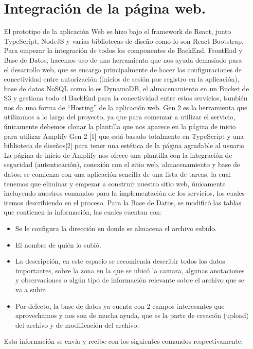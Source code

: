 \section{Integración de la página web.}

El prototipo de la aplicación Web se hizo bajo el framework de React, junto TypeScript, NodeJS y varías bibliotecas de diseño como lo son React Bootstrap, 
Para empezar la integración de todos los componentes de BackEnd, FrontEnd y Base de Datos, hacemos uso de una herramienta que nos ayuda demasiado para el desarrollo web, que se encarga principalmente de hacer las configuraciones de conectividad entre autorización (inicios de sesión por registro en la aplicación), base de datos NoSQL como lo es DynamoDB, el almacenamiento en un Bucket de S3 y gestiona todo el BackEnd para la conectividad entre estos servicios, también nos da una forma de “Hosting” de la aplicación web.
Gen 2 es la herramienta que utilizamos a lo largo del proyecto, ya que para comenzar a utilizar el servicio, únicamente debemos clonar la plantilla que nos aparece en la página de inicio para utilizar Amplify Gen 2 [1] que está basado totalmente en TypeScript y una biblioteca de diseños[2] para tener una estética de la página agradable al usuario 
La página de inicio de Amplify nos ofrece una plantilla con la integración de seguridad (autenticación), conexión con el sitio web, almacenamiento y base de datos; se comienza con una aplicación sencilla de una lista de tareas, la cual tenemos que eliminar y empezar a construir nuestro sitio web, únicamente incluyendo nuestros comandos para la implementación de los servicios, los cuales iremos describiendo en el proceso.
Para la Base de Datos, se modificó las tablas que contienen la información, las cuales cuentan con:

\begin{itemize}
	\item Se le configura la dirección en donde se almacena el archivo subido.
\item 	El nombre de quién lo subió.
	\item La descripción, en este espacio se recomienda describir todos los datos importantes, sobre la zona en la que se ubicó la camara, algunas anotaciones y observaciones o algún tipo de información relevante sobre el archivo que se va a subir.
	\item Por defecto, la base de datos ya cuenta con 2 campos interesantes que aprovechamos y nos son de mucha ayuda, que es la parte de creación (upload) del archivo y de modificación del archivo.
\end{itemize}
Esta información se envía y recibe con los siguientes comandos respectivamente:


